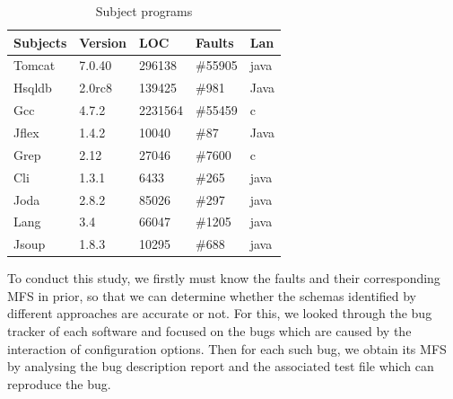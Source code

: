 \documentclass{sig-alternate-05-2015}
\begin{document}
{{\begin{table}[ht]
\caption{Subject programs}
\label{subject}
\centering
\begin{tabular}{l|l|l|l|l}
\hline
Subjects & Version & LOC & Faults &  Lan \\
\hline
Tomcat   &   7.0.40      & 296138    &   \#55905  & java  \\
Hsqldb   &   2.0rc8  &   139425   &    \#981  & Java \\
Gcc      &   4.7.2      &  2231564   & \#55459   &  c\\
Jflex    &    1.4.2     & 10040    &    \#87   & Java \\
Grep     &   2.12       & 27046   &    \#7600  & c \\
Cli      &   1.3.1      & 6433    &    \#265   & java  \\
Joda     &   2.8.2      & 85026   &    \#297   & java \\
Lang     &   3.4        & 66047  &     \#1205  & java \\
Jsoup    &    1.8.3     & 10295   &    \#688   & java \\

 \hline
\end{tabular}

\end{table}

To conduct this study, we firstly must know the faults and their corresponding MFS in prior, so that we can determine whether the schemas identified by different approaches are accurate or not. For this, we looked through the bug tracker of each software and focused on the bugs which are caused by the interaction of configuration options. Then for each such bug, we obtain its MFS by analysing the bug description report and the associated test file which can reproduce the bug.







}}
\end{document}
